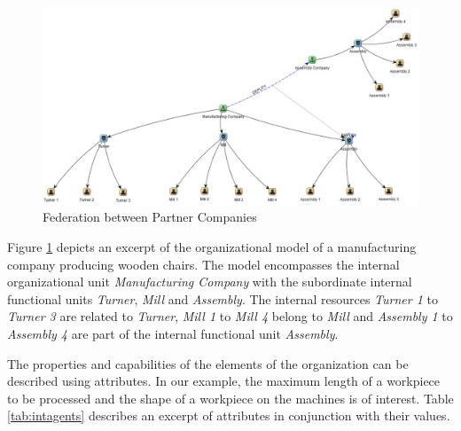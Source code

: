 \begin{figure}[htb!]
	\centering
	\includegraphics[width=\textwidth]{Figures/orgamodelfed.jpg}
	\caption{Federation between Partner Companies}
	\label{fig:federation}
\end{figure}

Figure \ref{fig:federation} depicts an excerpt of the organizational model of a manufacturing company producing wooden chairs. The model encompasses the internal organizational unit \emph{Manufacturing Company} with the subordinate internal functional units \emph{Turner}, \emph{Mill} and \emph{Assembly}. The internal resources \emph{Turner 1} to \emph{Turner 3} are related to \emph{Turner}, \emph{Mill 1} to \emph{Mill 4} belong to \emph{Mill} and \emph{Assembly 1} to \emph{Assembly 4} are part of the internal functional unit \emph{Assembly}. 

The properties and capabilities of the elements of the organization can be described using attributes. In our example, the maximum length of a workpiece to be processed and the shape of a workpiece on the machines is of interest.
Table \ref{tab:intagents}  describes an excerpt of attributes in conjunction with their values. 

